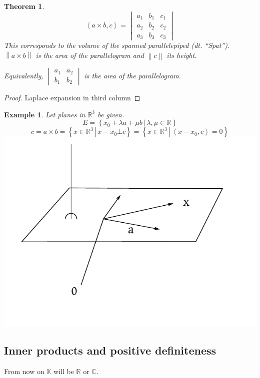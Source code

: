 \documentclass{article}
\newtheorem{theorem}{Theorem}  \numberwithin{theorem}{section}
\newtheorem{example}{Example}  \numberwithin{example}{section}
\newcommand{\setdef}[2]{\left\{\left.#1\,\right|\,#2\right\}}
\newcommand{\angel}[1]{\left\langle#1\right\rangle}
\newcommand{\norm}[1]{\left\|#1\right\|}
\begin{document}
\begin{theorem} %
  \[ \angel{a \times b, c} = \begin{vmatrix} a_1 & b_1 & c_1 \\ a_2 & b_2 & c_2 \\ a_3 & b_3 & c_3 \end{vmatrix} \]
  This corresponds to the volume of the spanned parallelepiped (dt. \foreignlanguage{german}{\enquote{Spat}}).
  $\norm{a \times b}$ is the area of the parallelogram and $\norm{c}$ its height.

  Equivalently, $\begin{vmatrix} a_1 & a_2 \\ b_1 & b_2 \end{vmatrix}$ is the area of the parallelogram.
\end{theorem}

\begin{proof}
  Laplace expansion in third column
\end{proof}

\begin{example} %
  Let planes in $\mathbb R^3$ be given.
  \[ E = \setdef{x_0 + \lambda a + \mu b}{\lambda, \mu \in \mathbb R} \]
  \[ c = a \times b = \setdef{x \in \mathbb R^3}{x - x_0 \bot c} = \setdef{x \in \mathbb R^3}{\angel{x - x_0, c} = 0} \]
  \includegraphics{img/05_application.pdf} %
\end{example}

\subsection{Inner products and positive definiteness}
From now on $\mathbb K$ will be $\mathbb R$ or $\mathbb C$.
\end{document}
